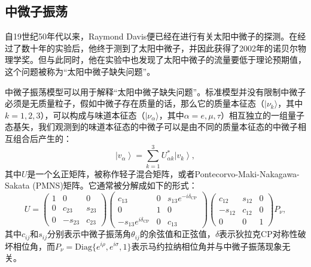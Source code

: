 \subsection{中微子振荡}

自19世纪50年代以来，Raymond Davis便已经在进行有关太阳中微子的探测\cite{Davis:1955}。在经过了数十年的实验后，他终于测到了太阳中微子，并因此获得了2002年的诺贝尔物理学奖。但与此同时，他在实验中也发现了太阳中微子的流量要低于理论预期值\cite{Cleveland:1998}，这个问题被称为“太阳中微子缺失问题”。

中微子振荡模型可以用于解释“太阳中微子缺失问题”\cite{Bahcall:2001}。标准模型并没有限制中微子必须是无质量粒子，假如中微子存在质量的话，那么它的质量本征态（$|\nu_k\rangle$，其中$k=1,2,3$），可以构成与味道本征态（$ |\nu_\alpha\rangle$，其中$\alpha = e, \mu, \tau$）相互独立的一组量子态基矢，我们观测到的味道本征态的中微子可以是由不同的质量本征态的中微子相互组合后产生的：
\begin{equation}
    \left|v_{\alpha}\right\rangle = \sum_{k=1}^{3} U_{\alpha k}^{*}\left|v_{k}\right\rangle , 
    \label{eq: neutrino oscillation}
\end{equation}
其中$U$是一个幺正矩阵，被称作轻子混合矩阵，或者Pontecorvo-Maki-Nakagawa-Sakata (PMNS)矩阵\cite{Pontecorvo:1957, Maki:1962, Pontecorvo:1967}。它通常被分解成如下的形式：
\begin{equation}
    U=\left(\begin{array}{ccc}{1} & {0} & {0} \\ {0} & {c_{23}} & {s_{23}} \\ {0} & {-s_{23}} & {c_{23}}\end{array}\right)\left(\begin{array}{ccc}{c_{13}} & {0} & {s_{13} e^{-i \delta_{\mathrm{CP}}}} \\ {0} & {1} & {0} \\ {-s_{13} e^{i \delta_{\mathrm{CP}}}} & {0} & {c_{13}}\end{array}\right)\left(\begin{array}{ccc}{c_{12}} & {s_{12}} & {0} \\ {-s_{12}} & {c_{12}} & {0} \\ {0} & {0} & {1}\end{array}\right) P_\nu , 
    \label{eq: PMNS matrix}
\end{equation}
其中$c_{ij}$和$s_{ij}$分别表示中微子振荡角$\theta_{ij}$的余弦值和正弦值，$\delta$表示狄拉克CP对称性破坏相位角，而$P_\nu = \mathrm{Diag} \{e^{i\rho},  e^{i\sigma}, 1 \}$表示马约拉纳相位角并与中微子振荡现象无关。

